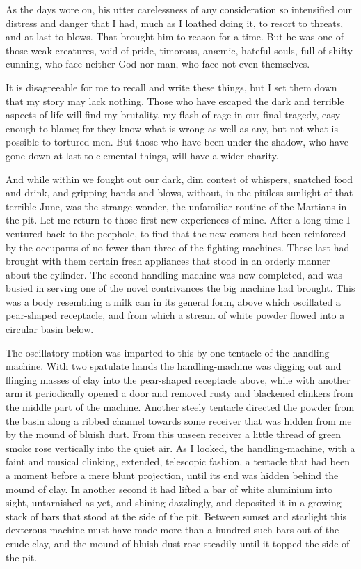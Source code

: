 As the days wore on, his utter carelessness of any consideration so intensified our distress and danger that I had, much as I loathed doing it, to resort to threats, and at last to blows. That brought him to reason for a time. But he was one of those weak creatures, void of pride, timorous, anæmic, hateful souls, full of shifty cunning, who face neither God nor man, who face not even themselves.

It is disagreeable for me to recall and write these things, but I set them down that my story may lack nothing. Those who have escaped the dark and terrible aspects of life will find my brutality, my flash of rage in our final tragedy, easy enough to blame; for they know what is wrong as well as any, but not what is possible to tortured men. But those who have been under the shadow, who have gone down at last to elemental things, will have a wider charity.

And while within we fought out our dark, dim contest of whispers, snatched food and drink, and gripping hands and blows, without, in the pitiless sunlight of that terrible June, was the strange wonder, the unfamiliar routine of the Martians in the pit. Let me return to those first new experiences of mine. After a long time I ventured back to the peephole, to find that the new-comers had been reinforced by the occupants of no fewer than three of the fighting-machines. These last had brought with them certain fresh appliances that stood in an orderly manner about the cylinder. The second handling-machine was now completed, and was busied in serving one of the novel contrivances the big machine had brought. This was a body resembling a milk can in its general form, above which oscillated a pear-shaped receptacle, and from which a stream of white powder flowed into a circular basin below.

The oscillatory motion was imparted to this by one tentacle of the handling-machine. With two spatulate hands the handling-machine was digging out and flinging masses of clay into the pear-shaped receptacle above, while with another arm it periodically opened a door and removed rusty and blackened clinkers from the middle part of the machine. Another steely tentacle directed the powder from the basin along a ribbed channel towards some receiver that was hidden from me by the mound of bluish dust. From this unseen receiver a little thread of green smoke rose vertically into the quiet air. As I looked, the handling-machine, with a faint and musical clinking, extended, telescopic fashion, a tentacle that had been a moment before a mere blunt projection, until its end was hidden behind the mound of clay. In another second it had lifted a bar of white aluminium into sight, untarnished as yet, and shining dazzlingly, and deposited it in a growing stack of bars that stood at the side of the pit. Between sunset and starlight this dexterous machine must have made more than a hundred such bars out of the crude clay, and the mound of bluish dust rose steadily until it topped the side of the pit.

